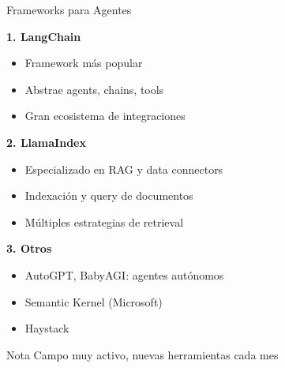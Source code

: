 \begin{frame}{Frameworks para Agentes}

\textbf{1. LangChain}
\begin{itemize}
    \item Framework más popular
    \item Abstrae agents, chains, tools
    \item Gran ecosistema de integraciones
\end{itemize}

\vspace{0.5em}

\textbf{2. LlamaIndex}
\begin{itemize}
    \item Especializado en RAG y data connectors
    \item Indexación y query de documentos
    \item Múltiples estrategias de retrieval
\end{itemize}

\vspace{0.5em}

\textbf{3. Otros}
\begin{itemize}
    \item AutoGPT, BabyAGI: agentes autónomos
    \item Semantic Kernel (Microsoft)
    \item Haystack
\end{itemize}

\vspace{0.5em}

\begin{alertblock}{Nota}
Campo muy activo, nuevas herramientas cada mes
\end{alertblock}

\end{frame}

